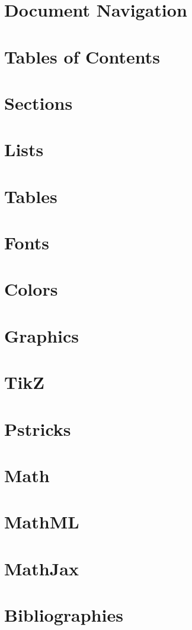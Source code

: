 \documentclass{book}
\begin{document}
\section{Document Navigation}
\section{Tables of Contents}

\section{Sections}
\section{Lists}
\section{Tables}

\section{Fonts}
\section{Colors}

\section{Graphics}
\section{TikZ }
\section{Pstricks}

\section{Math}
\section{MathML}
\section{MathJax}

\section{Bibliographies}
\end{document}
